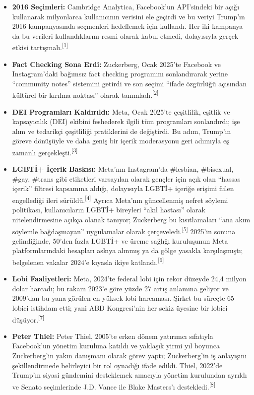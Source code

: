 \documentclass{article}
\begin{document}
\begin{itemize}

\item \textbf{2016 Seçimleri:} Cambridge Analytica, Facebook'un API'sindeki bir açığı kullanarak milyonlarca kullanıcının verisini ele geçirdi ve bu veriyi Trump'ın 2016 kampanyasında seçmenleri hedeflemek için kullandı. Her iki kampanya da bu verileri kullandıklarını resmi olarak kabul etmedi, dolayısıyla gerçek etkisi tartışmalı.\textsuperscript{[1]}

\item \textbf{Fact Checking Sona Erdi:} Zuckerberg, Ocak 2025'te Facebook ve Instagram'daki bağımsız fact checking programını sonlandırarak yerine ``community notes'' sistemini getirdi ve son seçimi ``ifade özgürlüğü açısından kültürel bir kırılma noktası'' olarak tanımladı.\textsuperscript{[2]}

\item \textbf{DEI Programları Kaldırıldı:} Meta, Ocak 2025'te çeşitlilik, eşitlik ve kapsayıcılık (DEI) ekibini feshederek ilgili tüm programları sonlandırdı; işe alım ve tedarikçi çeşitliliği pratiklerini de değiştirdi. Bu adım, Trump'ın göreve dönüşüyle ve daha geniş bir içerik moderasyonu geri adımıyla eş zamanlı gerçekleşti.\textsuperscript{[3]}

\item \textbf{LGBTİ+ İçerik Baskısı:} Meta'nın Instagram'da \#lesbian, \#bisexual, \#gay, \#trans gibi etiketleri varsayılan olarak gençler için açık olan ``hassas içerik'' filtresi kapsamına aldığı, dolayısıyla LGBTİ+ içeriğe erişimi fiilen engellediği ileri sürüldü.\textsuperscript{[4]} Ayrıca Meta'nın güncellenmiş nefret söylemi politikası, kullanıcıların LGBTİ+ bireyleri ``akıl hastası'' olarak nitelendirmesine açıkça olanak tanıyor; Zuckerberg bu kısıtlamaları ``ana akım söylemle bağdaşmayan'' uygulamalar olarak çerçeveledi.\textsuperscript{[5]} 2025'in sonuna gelindiğinde, 50'den fazla LGBTİ+ ve üreme sağlığı kuruluşunun Meta platformlarındaki hesapları askıya alınmış ya da gölge yasakla karşılaşmıştı; belgelenen vakalar 2024'e kıyasla ikiye katlandı.\textsuperscript{[6]}

\item \textbf{Lobi Faaliyetleri:} Meta, 2024'te federal lobi için rekor düzeyde 24,4 milyon dolar harcadı; bu rakam 2023'e göre yüzde 27 artış anlamına geliyor ve 2009'dan bu yana görülen en yüksek lobi harcaması. Şirket bu süreçte 65 lobici istihdam etti; yani ABD Kongresi'nin her sekiz üyesine bir lobici düşüyor.\textsuperscript{[7]}

\item \textbf{Peter Thiel:} Peter Thiel, 2005'te erken dönem yatırımcı sıfatıyla Facebook'un yönetim kuruluna katıldı ve yaklaşık yirmi yıl boyunca Zuckerberg'in yakın danışmanı olarak görev yaptı; Zuckerberg'in iş anlayışını şekillendirmede belirleyici bir rol oynadığı ifade edildi. Thiel, 2022'de Trump'ın siyasi gündemini desteklemek amacıyla yönetim kurulundan ayrıldı ve Senato seçimlerinde J.D. Vance ile Blake Masters'ı destekledi.\textsuperscript{[8]}

\end{itemize}
\end{document}

